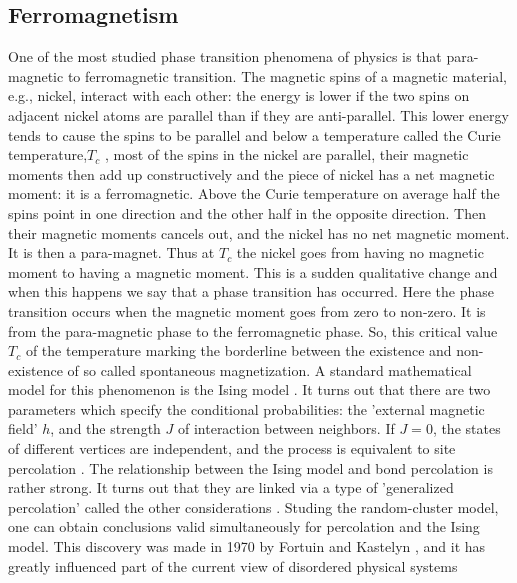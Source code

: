	\subsection{Ferromagnetism}
	One of the most studied phase transition phenomena of physics is that para-magnetic to ferromagnetic transition. The magnetic spins of a magnetic material, e.g., nickel, interact with each other:	the energy is lower if the two spins on adjacent nickel atoms are parallel than if they are anti-parallel. This lower energy tends to cause the spins to be parallel and below a temperature called	the Curie temperature,$T_c$ , most of the spins in the nickel are parallel, their magnetic moments then	add up constructively and the piece of nickel has a net magnetic moment: it is a ferromagnetic.
	 Above the Curie temperature on average half the spins point in one direction and the other half in	the opposite direction. Then their magnetic moments cancels out, and the nickel has no net magnetic	moment. It is then a para-magnet. Thus at $T_c$ the nickel goes from having no magnetic moment to	having a magnetic moment. This is a sudden qualitative change and when this happens we say that	a phase transition has occurred. Here the phase transition occurs when the magnetic moment goes	from zero to non-zero. It is from the para-magnetic phase to the ferromagnetic phase.	So, this critical value $T_c$ of the temperature marking the borderline between the existence and	non-existence of so called spontaneous magnetization. A standard mathematical model for this	phenomenon is the Ising model \cite{Cipra1987}. It turns out that there are two parameters which specify	the conditional probabilities: the 'external magnetic field' $h$, and the strength $J$ of interaction	between neighbors. If $J = 0$, the states of different vertices are independent, and the process is	equivalent to site percolation \cite{Coniglio1976}. The relationship between the Ising model and bond percolation	is rather strong. It turns out that they are linked via a type of 'generalized percolation' called the other considerations \cite{Coleman1992, Seiden1990}. 
	 Studing the random-cluster model,
	 one can obtain conclusions valid simultaneously for percolation and the Ising model.
	 This discovery was made in 1970 by Fortuin and Kastelyn \cite{Fortuin1972a, Fortuin1972b, Fortuin1972c}, and it has
	 greatly influenced part of the current view of disordered physical systems
	 
	 
